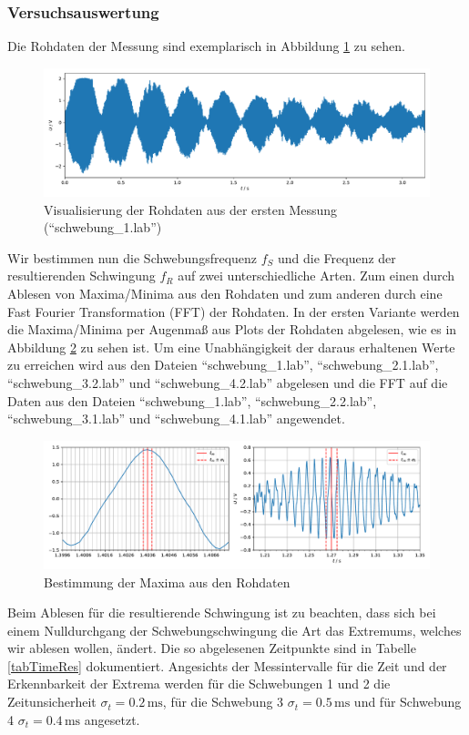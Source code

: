 \subsubsection{Versuchsauswertung}

Die Rohdaten der Messung sind exemplarisch in Abbildung \ref{rohSch} zu sehen.

\begin{figure}[h]
	\centering
	\includegraphics[width=\linewidth]{plots/rohdaten_schwebung.pdf}
	\caption{Visualisierung der Rohdaten aus der ersten Messung (\mbox{``schwebung\_1.lab''})}
	\label{rohSch}
\end{figure}

Wir bestimmen nun die Schwebungsfrequenz $f_S$ und die Frequenz der resultierenden Schwingung $f_R$ auf zwei unterschiedliche Arten. Zum einen durch Ablesen von Maxima/Minima aus den Rohdaten und zum anderen durch eine Fast Fourier Transformation (FFT) der Rohdaten. 
In der ersten Variante werden die Maxima/Minima per Augenmaß aus Plots der Rohdaten abgelesen, wie es in Abbildung \ref{MaxAblesen} zu sehen ist. Um eine Unabhängigkeit der daraus erhaltenen Werte zu erreichen wird aus den Dateien \mbox{``schwebung\_1.lab''}, \mbox{``schwebung\_2.1.lab''}, \mbox{``schwebung\_3.2.lab''} und \mbox{``schwebung\_4.2.lab''} abgelesen und die FFT auf die Daten aus den Dateien \mbox{``schwebung\_1.lab''}, \mbox{``schwebung\_2.2.lab''}, \\
\mbox{``schwebung\_3.1.lab''} und \mbox{``schwebung\_4.1.lab''} angewendet.

\begin{figure}[h]
	\centering
	\includegraphics[width=\linewidth]{plots/bspMaxima.pdf}
	\caption{Bestimmung der Maxima aus den Rohdaten}
	\label{MaxAblesen}
\end{figure}
Beim Ablesen für die resultierende Schwingung ist zu beachten, dass sich bei einem Nulldurchgang der Schwebungschwingung die Art das Extremums, welches wir ablesen wollen, ändert. Die so abgelesenen Zeitpunkte sind in Tabelle \ref{tabTimeRes} dokumentiert. Angesichts der Messintervalle für die Zeit und der Erkennbarkeit der Extrema werden für die Schwebungen 1 und 2 die Zeitunsicherheit $\sigma_t = 0.2 \, \mathrm{ms}$, für die Schwebung 3 $\sigma_t = 0.5 \, \mathrm{ms}$ und für Schwebung 4 $\sigma_t = 0.4 \, \mathrm{ms}$ angesetzt.

